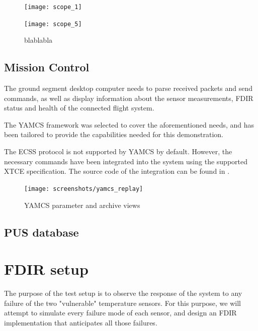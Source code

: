 \documentclass[a4paper,nobib]{tufte-book}
\begin{document}
\begin{figure}[h]
	\texttt{[image: scope\_1]}
	\label{subfig:i2c_clean}
\end{figure}

\begin{figure}[h]
	\texttt{[image: scope\_5]}
	\caption{blablabla}
	\label{subfig:i2c_dirty}
\end{figure}

\FloatBarrier

\subsection{Mission Control}

The ground segment desktop computer needs to parse received packets and send commands, as well as display information about the sensor measurements, \ac{FDIR} status and health of the connected flight system.

The \acs{YAMCS} \autocite{sela_yamcs_lightweight_2012} framework was selected to cover the aforementioned needs, and has been tailored to provide the capabilities needed for this demonstration.

The \ac{ECSS} protocol\autocite{ECSS-E-ST-70-41C} is not supported by \acs{YAMCS} by default. However, the necessary commands have been integrated into the system using the supported \ac{XTCE} specification.\autocite{simon_xtce_standard_2004} The source code of the integration can be found in .

\begin{figure}[h]
	\texttt{[image: screenshots/yamcs\_replay]}
	\caption{\acs{YAMCS} parameter and archive views}
\end{figure}

\subsection{\acs{PUS} database}


\section{\ac{FDIR} setup}

The purpose of the test setup is to observe the response of the system to any failure of the two "vulnerable" temperature sensors. For this purpose, we will attempt to simulate every failure mode of each sensor, and design an \ac{FDIR} implementation that anticipates all those failures.
\end{document}
